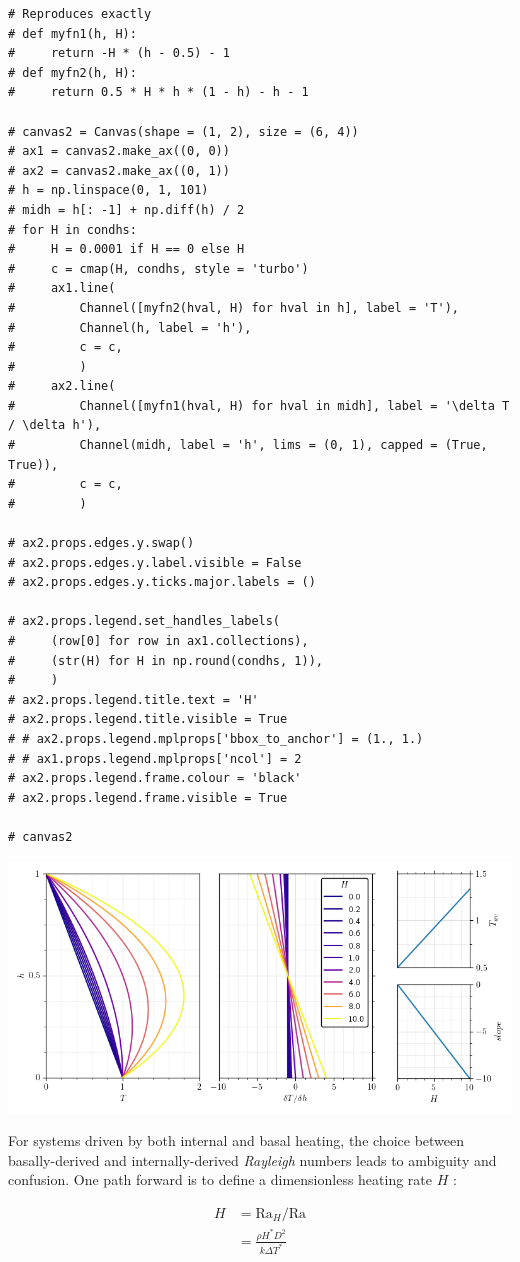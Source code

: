 \begin{verbatim}
# Reproduces exactly
# def myfn1(h, H):
#     return -H * (h - 0.5) - 1
# def myfn2(h, H):
#     return 0.5 * H * h * (1 - h) - h - 1

# canvas2 = Canvas(shape = (1, 2), size = (6, 4))
# ax1 = canvas2.make_ax((0, 0))
# ax2 = canvas2.make_ax((0, 1))
# h = np.linspace(0, 1, 101)
# midh = h[: -1] + np.diff(h) / 2
# for H in condhs:
#     H = 0.0001 if H == 0 else H
#     c = cmap(H, condhs, style = 'turbo')
#     ax1.line(
#         Channel([myfn2(hval, H) for hval in h], label = 'T'),
#         Channel(h, label = 'h'),
#         c = c,
#         )
#     ax2.line(
#         Channel([myfn1(hval, H) for hval in midh], label = '\delta T / \delta h'),
#         Channel(midh, label = 'h', lims = (0, 1), capped = (True, True)),
#         c = c,
#         )

# ax2.props.edges.y.swap()
# ax2.props.edges.y.label.visible = False
# ax2.props.edges.y.ticks.major.labels = ()

# ax2.props.legend.set_handles_labels(
#     (row[0] for row in ax1.collections),
#     (str(H) for H in np.round(condhs, 1)),
#     )
# ax2.props.legend.title.text = 'H'
# ax2.props.legend.title.visible = True
# # ax2.props.legend.mplprops['bbox_to_anchor'] = (1., 1.)
# # ax1.props.legend.mplprops['ncol'] = 2
# ax2.props.legend.frame.colour = 'black'
# ax2.props.legend.frame.visible = True

# canvas2
\end{verbatim}

\includegraphics[width=0.7\linewidth]{files/545b6b3bb6664e7aace68e605ea8524a.png}

For systems driven by both internal and basal heating, the choice between basally-derived and internally-derived \textit{Rayleigh} numbers leads to ambiguity and confusion. One path forward is to define a dimensionless heating rate $H$ \cite{Schubert2001-ea}:

\begin{align*}
H &= {\mathrm{Ra}}_H / \mathrm{Ra} \\
&= \frac{\rho H^{*} D^2}{k {\Delta T}^{*}}
\end{align*}

